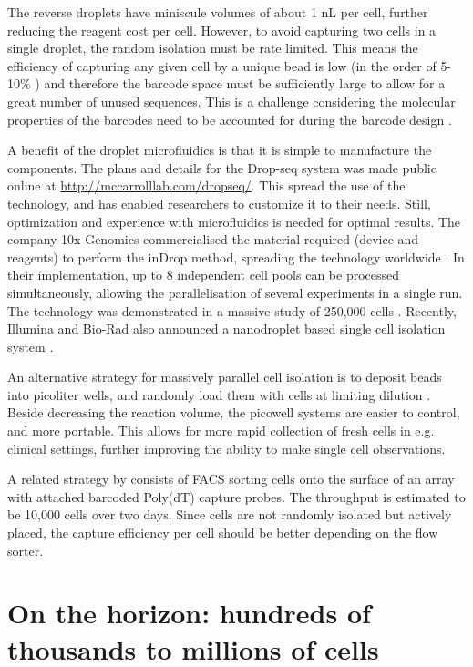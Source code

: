 The reverse droplets have miniscule volumes of about 1 nL per cell, further reducing the reagent cost per cell. However, to avoid capturing two cells in a single droplet, the random isolation must be rate limited. This means the efficiency of capturing any given cell by a unique bead is low (in the order of 5-10\% \cite{Klein2015-ti, Macosko2015-jb}) and therefore the barcode space must be sufficiently large to allow for a great number of unused sequences. This is a challenge considering the molecular properties of the barcodes need to be accounted for during the barcode design \cite{Costea2013-oj}.

A benefit of the droplet microfluidics is that it is simple to manufacture the components. The plans and details for the Drop-seq system was made public online at \url{http://mccarrolllab.com/dropseq/}. This spread the use of the technology, and has enabled researchers to customize it to their needs. Still, optimization and experience with microfluidics is needed for optimal results. The company 10x Genomics commercialised the material required (device and reagents) to perform the inDrop method, spreading the technology worldwide \cite{10x_Genomics_Inc2016-do}. In their implementation, up to 8 independent cell pools can be processed simultaneously, allowing the parallelisation of several experiments in a single run. The technology was demonstrated in a massive study of 250,000 cells \cite{Zheng2017-th}. Recently, Illumina and Bio-Rad also announced a nanodroplet based single cell isolation system \cite{Illumina_Inc2017-wj}.

An alternative strategy for massively parallel cell isolation is to deposit beads into picoliter wells, and randomly load them with cells at limiting dilution \cite{Christina_Fan2015-dy, Gierahn2017-xv, Bose2015-dt}. Beside decreasing the reaction volume, the picowell systems are easier to control, and more portable. This allows for more rapid collection of fresh cells in e.g. clinical settings, further improving the ability to make single cell observations.

A related strategy by \citet{Vickovic2016-or} consists of FACS sorting cells onto the surface of an array with attached barcoded Poly(dT) capture probes. The throughput is estimated to be 10,000 cells over two days. Since cells are not randomly isolated but actively placed, the capture efficiency per cell should be better depending on the flow sorter.

\section{On the horizon: hundreds of thousands to millions of cells}

